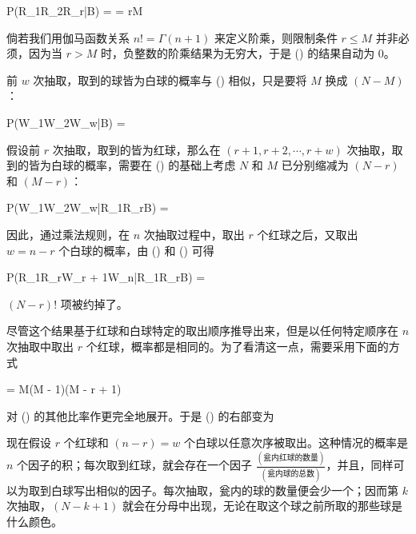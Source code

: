 \placeformula[3-12]
\startformula
\startmathalignment[style=\displaystyle]
\NC P(R_1R_2\cdots R_r|B) \NC = \NR
\NC \NC = \quad\quad r\le M\NR
\stopmathalignment
\stopformula

倘若我们用伽马函数关系 $n! = \Gamma(n + 1)$ 来定义阶乘，则限制条件 $r\le M$ 并非必须，因为当 $r > M$ 时，负整数的阶乘结果为无穷大，于是 (\in[3-12]) 的结果自动为 0。

前 $w$ 次抽取，取到的球皆为白球的概率与 (\in[3-12]) 相似，只是要将 $M$ 换成 $(N - M)$：

\placeformula[3-13]
\startformula
P(W_1W_2\cdots W_w|B) = 
\stopformula

假设前 $r$ 次抽取，取到的皆为红球，那么在 $(r + 1, r + 2, \cdots,r + w)$ 次抽取，取到的皆为白球的概率，需要在 (\in[3-13]) 的基础上考虑 $N$ 和 $M$ 已分别缩减为 $(N - r)$ 和 $(M - r)$：

\placeformula[3-14]
\startformula
P(W_1W_2\cdots W_w|R_1\cdots R_rB) = 
\stopformula

因此，通过乘法规则，在 $n$ 次抽取过程中，取出 $r$ 个红球之后，又取出 $w = n - r$ 个白球的概率，由 (\in[3-12]) 和 (\in[3-14]) 可得

\placeformula[3-15]
\startformula
P(R_1\cdots R_rW_{r + 1}\cdots W_n|R_1\cdots R_rB) = 
\stopformula

$(N - r)!$ 项被约掉了。

尽管这个结果基于红球和白球特定的取出顺序推导出来，但是以任何特定顺序在 $n$ 次抽取中取出 $r$ 个红球，概率都是相同的。为了看清这一点，需要采用下面的方式

\placeformula[3-16]
\startformula
{} = M(M - 1)\cdots (M - r + 1)
\stopformula

对 (\in[3-15]) 的其他比率作更完全地展开。于是 (\in[3-15]) 的右部变为

\placeformula[3-17]
\startformula
{}
\stopformula

现在假设 $r$ 个红球和 $(n - r) = w$ 个白球以任意次序被取出。这种情况的概率是 $n$ 个因子的积；每次取到红球，就会存在一个因子 $\frac{(\text{瓮内红球的数量})}{(\text{瓮内球的总数})}$，并且，同样可以为取到白球写出相似的因子。每次抽取，瓮内的球的数量便会少一个；因而第 $k$ 次抽取，$(N - k + 1)$ 就会在分母中出现，无论在取这个球之前所取的那些球是什么颜色。

